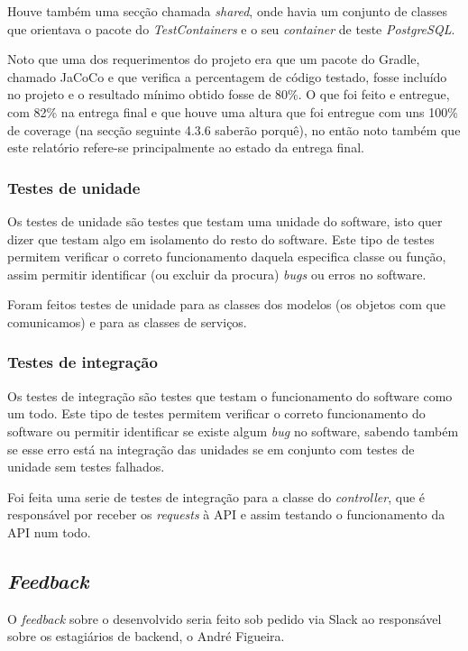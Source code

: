 Houve também uma secção chamada \textit{shared}, onde havia um conjunto de classes que orientava o pacote do \textit{TestContainers} e o seu \textit{container} de teste \textit{PostgreSQL}.

Noto que uma dos requerimentos do projeto era que um pacote do Gradle, chamado JaCoCo e que verifica a percentagem de código testado, fosse incluído no projeto e o resultado mínimo obtido fosse de 80\%. O que foi feito e entregue, com 82\% na entrega final e que houve uma altura que foi entregue com uns 100\% de coverage (na secção seguinte 4.3.6 saberão porquê), no então noto também que este relatório refere-se principalmente ao estado da entrega final.

\subsubsection{Testes de unidade}

Os testes de unidade são testes que testam uma unidade do software, isto quer dizer que testam algo em isolamento do resto do software. Este tipo de testes permitem verificar o correto funcionamento daquela especifica classe ou função, assim permitir identificar (ou excluir da procura) \textit{bugs} ou erros no software.

Foram feitos testes de unidade para as classes dos modelos (os objetos com que comunicamos) e para as classes de serviços.

\subsubsection{Testes de integração}

Os testes de integração são testes que testam o funcionamento do software como um todo. Este tipo de testes permitem verificar o correto funcionamento do software ou permitir identificar se existe algum \textit{bug} no software, sabendo também se esse erro está na integração das unidades se em conjunto com testes de unidade sem testes falhados.

Foi feita uma serie de testes de integração para a classe do \textit{controller}, que é responsável por receber os \textit{requests} à API e assim testando o funcionamento da API num todo.

\subsection{\textit{Feedback}}

O \textit{feedback} sobre o desenvolvido seria feito sob pedido via Slack ao responsável sobre os estagiários de backend, o André Figueira.

